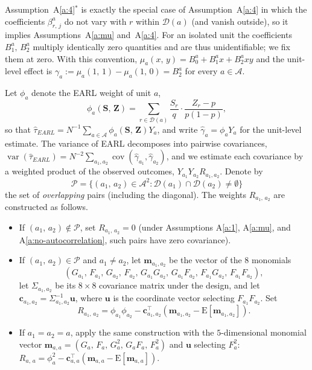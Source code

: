 \documentclass[sigconf,anonymous,review]{acmart}
\newcommand{\E}{\mathrm E}
\DeclareMathOperator{\var}{var}
\DeclareMathOperator{\cov}{cov}
\begin{document}
Assumption~A\ref{a:4}$^*$ is exactly the special case of Assumption~A\ref{a:4} in which the coefficients $\beta^a_{r,\,j}$ do not vary with $r$ within $\mathcal D(a)$ (and vanish outside), so it implies Assumptions~A\ref{a:mu} and~A\ref{a:4}. For an isolated unit the coefficients $B_1^a,\,B_2^a$ multiply identically zero quantities and are thus unidentifiable; we fix them at zero. With this convention, $\mu_a(x,\,y) = B_0^a + B_1^ax + B_2^axy$ and the unit-level effect is $\gamma_a := \mu_a(1,\,1)-\mu_a(1,\,0) = B_2^a$ for every $a\in\mathcal A$.

Let $\phi_a$ denote the EARL weight of unit $a$,
\begin{equation}\label{def:phi}
    \phi_a(\mathbf S,\,\mathbf Z) = \sum_{r\in\mathcal D(a)}\frac{S_r}{q}\cdot\frac{Z_r - p}{p(1-p)},
\end{equation}
so that $\hat\tau^{\phantom{1}}_{EARL} = N^{-1}\sum_{a\in\mathcal A}\phi_a(\mathbf S,\,\mathbf Z)Y_a$, and write $\hat\gamma_a = \phi_aY_a$ for the unit-level estimate. The variance of EARL decomposes into pairwise covariances, $\var(\hat\tau_{EARL}) = N^{-2}\sum_{a_1,a_2}\cov(\hat\gamma_{a_1},\hat\gamma_{a_2})$, and we estimate each covariance by a weighted product of the observed outcomes, $Y_{a_1}Y_{a_2}R_{a_1,a_2}$. Denote by
$$
\mathcal P = \{(a_1,\,a_2)\in\mathcal A^2\colon \mathcal D(a_1)\cap\mathcal D(a_2)\neq\emptyset\}
$$
the set of \emph{overlapping} pairs (including the diagonal). The weights $R_{a_1,\,a_2}$ are constructed as follows.
\begin{itemize}
    \item If $(a_1,\,a_2)\notin\mathcal P$, set $R_{a_1,\,a_2}=0$ (under Assumptions A\ref{a:1}, A\ref{a:mu}, and A\ref{a:no-autocorrelation}, such pairs have zero covariance).
    \item If $(a_1,\,a_2)\in\mathcal P$ and $a_1\neq a_2$, let $\mathbf m_{a_1,a_2}$ be the vector of the $8$ monomials
    \begin{equation*}
        (G_{a_1},\,F_{a_1},\,G_{a_2},\,F_{a_2},\,G_{a_1}G_{a_2},\,G_{a_1}F_{a_2},\,F_{a_1}G_{a_2},\,F_{a_1}F_{a_2}),
    \end{equation*}
    let $\Sigma_{a_1,a_2}$ be its $8\times 8$ covariance matrix under the design, and let $\mathbf c_{a_1,a_2} = \Sigma^{-1}_{a_1,a_2}\mathbf u$, where $\mathbf u$ is the coordinate vector selecting $F_{a_1}F_{a_2}$. Set
    \begin{equation}\label{def:R}
        R_{a_1,\,a_2} = \phi_{a_1}\phi_{a_2} - \mathbf c_{a_1,a_2}^{\top}\left(\mathbf m_{a_1,a_2} - \E[\mathbf m_{a_1,a_2}]\right).
    \end{equation}
    \item If $a_1=a_2=a$, apply the same construction with the $5$-dimen\-sional monomial vector $\mathbf m_{a,a} = (G_a,\,F_a,\,G_a^2,\,G_aF_a,\,F_a^2)$ and $\mathbf u$ selecting $F_a^2$:
    $R_{a,\,a} = \phi_{a}^2 - \mathbf c_{a,a}^{\top}(\mathbf m_{a,a} - \E[\mathbf m_{a,a}])$.
\end{itemize}
\end{document}
